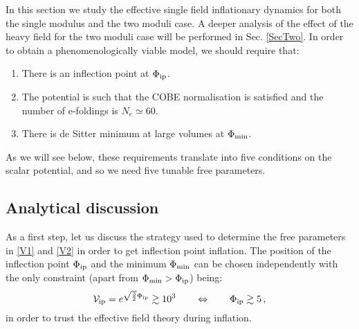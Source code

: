 \documentclass[11pt,a4paper]{article}
\newcommand{\ben}{\begin{enumerate}}
\newcommand{\een}{\end{enumerate}}
\newcommand{\be}{\begin{equation}}
\newcommand{\ee}{\end{equation}}
\newcommand\vo{{\mathcal{V}}}
\begin{document}
In this section we study the effective single field inflationary dynamics for both the single modulus and the two moduli case. A deeper analysis of the effect of the heavy field for the two moduli case will be performed in Sec. \ref{SecTwo}. In order to obtain a phenomenologically viable model, we should require that:
\ben
\item There is an inflection point at $\Phi_{\rm ip}$.
\item The potential is such that the COBE normalisation is satisfied and the number of e-foldings is $N_e \simeq 60$.
\item There is de Sitter minimum at large volumes at $\Phi_{\rm min}$.
\een
As we will see below, these requirements translate into five conditions on the scalar potential, and so we need five tunable free parameters.


\subsection{Analytical discussion}

As a first step, let us discuss the strategy used to determine the free parameters in \eqref{V1} and \eqref{V2} in order to get inflection point inflation. The position of the inflection point $\Phi_{\rm ip}$ and the minimum $\Phi_{\rm min}$ can be chosen independently with the only constraint (apart from $\Phi_{\rm min}>\Phi_{\rm ip}$) being:
\be
\vo_{\rm ip} = e^{\sqrt{\frac{3}{2}} \Phi_{\rm ip}} \gtrsim 10^3\qquad\Leftrightarrow\qquad\Phi_{\rm ip} \gtrsim 5\,,
\ee
in order to trust the effective field theory during inflation.
\end{document}
